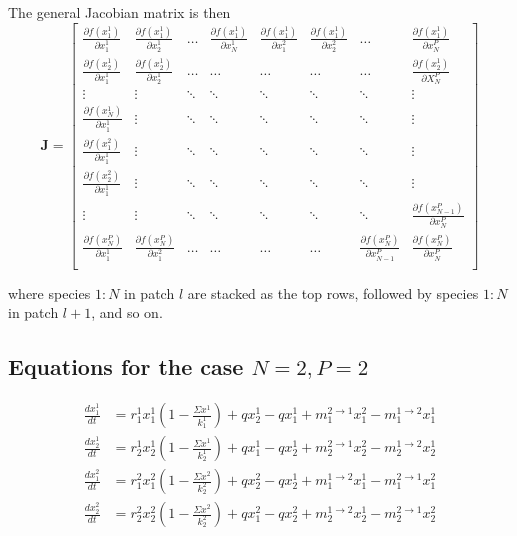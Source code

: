 \documentclass[12pt]{article}
\begin{document}
The general Jacobian matrix is then
\[ \mathbf{J} = \begin{bmatrix}
    \frac{\partial f(x_1^1)}{\partial x_1^1} & \frac{\partial f(x_1^1)}{\partial x_2^1} & \dots & \frac{\partial f(x_1^1)}{\partial x_N^1}  &  \frac{\partial f(x_1^1)}{\partial x_1^2} & \frac{\partial f(x_1^1)}{\partial x_2^2} & \dots & \frac{\partial f(x_1^1)}{\partial x_N^{P}} \\ 
    \frac{\partial f(x_2^1)}{\partial x_1^1} &  \frac{\partial f(x_2^1)}{\partial x_2^1} & \dots & \dots & \dots & \dots & \dots & \frac{\partial f(x_2^1)}{\partial X_N^P} \\
    \vdots    & \vdots & \ddots  & \ddots & \ddots & \ddots & \ddots & \vdots\\
    \frac{\partial f(x_N^1)}{\partial x_1^1} & \vdots   & \ddots  & \ddots & \ddots & \ddots & \ddots & \vdots \\
    \frac{\partial f(x_1^2)}{\partial x_1^1} & \vdots & \ddots  & \ddots & \ddots & \ddots & \ddots & \vdots \\
    \frac{\partial f(x_2^2)}{\partial x_1^1} & \vdots & \ddots  & \ddots & \ddots & \ddots & \ddots & \vdots\\
    \vdots   & \vdots & \ddots  & \ddots & \ddots & \ddots & \ddots & \frac{\partial f(x_{N-1}^P)}{\partial x_N^P}\\
    \frac{\partial f(x_N^P)}{\partial x_1^1} & \frac{\partial f(x_N^P)}{\partial x_1^2} & \dots & \dots & \dots & \dots & \frac{\partial f(x_N^P)}{\partial x_{N-1}^P} & \frac{\partial f(x_N^P)}{\partial x_N^P} \\    
\end{bmatrix} \]

where species $1:N$ in patch $l$ are stacked as the top rows, followed by species $1:N$ in patch $l+1$, and so on. 

\subsection*{Equations for the case $N = 2, P=2$}

\begin{align*}
\frac{dx_1^1}{dt} &=  r_1^1 x_1^1\left(1 - \frac{\Sigma x^1}{k_1^1}\right)  + qx_2^1 - qx_1^1+  m_1^{2\rightarrow 1} x_1^2 - m_1^{1\rightarrow 2} x_1^1\\
\frac{dx_2^1}{dt} &= r_2^1 x_2^1\left(1 - \frac{\Sigma x^1}{k_2^1}\right) + qx_1^1 - qx_2^1 + m_2^{2\rightarrow 1} x_2^2 - m_2^{1\rightarrow 2}x_2^1\\
\frac{dx_1^2}{dt} &=  r_1^2 x_1^2\left(1 - \frac{\Sigma x^2}{k_2^2}\right) + qx_2^2 - qx_2^1 + m_1^{1\rightarrow 2}x_1^1 - m_1^{2\rightarrow 1}x_1^2 \\
\frac{dx_2^2}{dt} &=  r_2^2 x_2^2\left(1 - \frac{\Sigma x^2}{k_2^2}\right) + qx_1^2 - qx_2^2 + m_2^{1\rightarrow 2} x_2^1 - m_2^{2\rightarrow 1} x_2^2\\
\end{align*}
\end{document}
